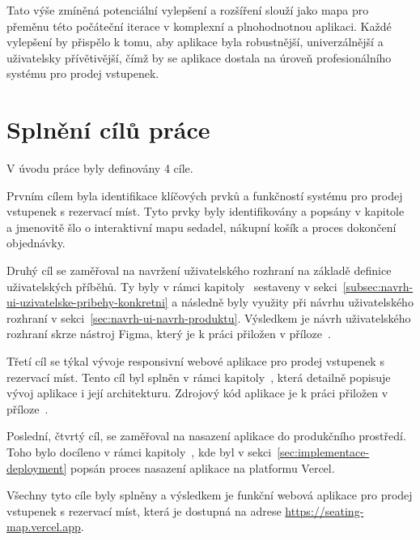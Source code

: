 Tato výše zmíněná potenciální vylepšení a rozšíření slouží jako mapa pro přeměnu této počáteční iterace v komplexní a plnohodnotnou aplikaci.
Každé vylepšení by přispělo k tomu, aby aplikace byla robustnější, univerzálnější a uživatelsky přívětivější, čímž by se aplikace dostala na úroveň profesionálního systému pro prodej vstupenek.


\section*{Splnění cílů práce}
\label{sec:zaver-cile}
V úvodu práce byly definovány 4 cíle.

Prvním cílem byla identifikace klíčových prvků a funkčností systému pro prodej vstupenek s rezervací míst.
Tyto prvky byly identifikovány a popsány v kapitole~ a jmenovitě šlo o interaktivní mapu sedadel, nákupní košík a proces dokončení objednávky.

Druhý cíl se zaměřoval na navržení uživatelského rozhraní na základě definice uživatelských příběhů.
Ty byly v rámci kapitoly~ sestaveny v sekci~\ref{subsec:navrh-ui-uzivatelske-pribehy-konkretni} a následně byly využity při návrhu uživatelského rozhraní v sekci~\ref{sec:navrh-ui-navrh-produktu}.
Výsledkem je návrh uživatelského rozhraní skrze nástroj Figma, který je k práci přiložen v příloze~.

Třetí cíl se týkal vývoje responsivní webové aplikace pro prodej vstupenek s rezervací míst.
Tento cíl byl splněn v rámci kapitoly~, která detailně popisuje vývoj aplikace i její architekturu.
Zdrojový kód aplikace je k práci přiložen v příloze~.

Poslední, čtvrtý cíl, se zaměřoval na nasazení aplikace do produkčního prostředí.
Toho bylo docíleno v rámci kapitoly~, kde byl v sekci~\ref{sec:implementace-deployment} popsán proces nasazení aplikace na platformu Vercel.

Všechny tyto cíle byly splněny a výsledkem je funkční webová aplikace pro prodej vstupenek s rezervací míst, která je dostupná na adrese \url{https://seating-map.vercel.app}.



